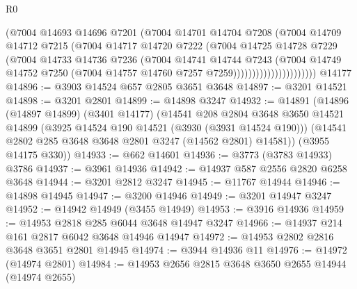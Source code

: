 \begin{lexlean}{R0}
\begin{coremodule}
                              (@7004
                                @14693
                                @14696
                                @7201
                                (@7004
                                  @14701
                                  @14704
                                  @7208
                                  (@7004
                                    @14709
                                    @14712
                                    @7215
                                    (@7004
                                      @14717
                                      @14720
                                      @7222
                                      (@7004
                                        @14725
                                        @14728
                                        @7229
                                        (@7004
                                          @14733
                                          @14736
                                          @7236
                                          (@7004
                                            @14741
                                            @14744
                                            @7243
                                            (@7004
                                              @14749
                                              @14752
                                              @7250
                                              (@7004 @14757 @14760 @7257 @7259))))))))))))))))))))))
    @14177
@14896 := @3903 @14524 @657 @2805 @3651 @3648
@14897 := @3201 @14521
@14898 := @3201 @2801
@14899 := @14898 @3247
@14932 := @14891
    (@14896
      (@14897 @14899)
      (@3401 @14177)
      (@14541
        @208
        @2804
        @3648
        @3650
        @14521
        @14899
        (@3925 @14524 @190 @14521 (@3930 (@3931 @14524 @190)))
        (@14541 @2802 @285 @3648 @3648 @2801 @3247 (@14562 @2801) @14581))
      (@3955 @14175 @330))
@14933 := @662 @14601
@14936 := @3773 (@3783 @14933) @3786
@14937 := @3961 @14936
@14942 := @14937 @587 @2556 @2820 @6258 @3648
@14944 := @3201 @2812 @3247
@14945 := @11767 @14944
@14946 := @14898 @14945
@14947 := @3200 @14946
@14949 := @3201 @14947 @3247
@14952 := @14942 @14949 (@3455 @14949)
@14953 := @3916 @14936
@14959 := @14953 @2818 @285 @6044 @3648 @14947 @3247
@14966 := @14937 @214 @161 @2817 @6042 @3648 @14946 @14947
@14972 := @14953 @2802 @2816 @3648 @3651 @2801 @14945
@14974 := @3944 @14936 @11
@14976 := @14972 (@14974 @2801)
@14984 := @14953 @2656 @2815 @3648 @3650 @2655 @14944 (@14974 @2655)

\end{coremodule}
\end{lexlean}
